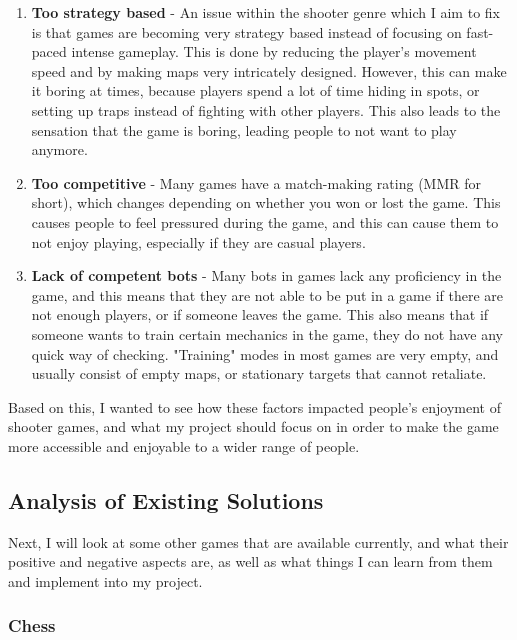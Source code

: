\begin{enumerate}[label=\textbf{\arabic*.}]
    \item \textbf{Too strategy based} - An issue within the shooter genre which I aim to fix is that games are becoming very strategy based instead of focusing on fast-paced intense gameplay. This is done by reducing the player's movement speed and by making maps very intricately designed. However, this can make it boring at times, because players spend a lot of time hiding in spots, or setting up traps instead of fighting with other players. This also leads to the sensation that the game is boring, leading people to not want to play anymore.
    \item \textbf{Too competitive} - Many games have a match-making rating (MMR for short), which changes depending on whether you won or lost the game. This causes people to feel pressured during the game, and this can cause them to not enjoy playing, especially if they are casual players.
    \item \textbf{Lack of competent bots} - Many bots in games lack any proficiency in the game, and this means that they are not able to be put in a game if there are not enough players, or if someone leaves the game. This also means that if someone wants to train certain mechanics in the game, they do not have any quick way of checking. "Training" modes in most games are very empty, and usually consist of empty maps, or stationary targets that cannot retaliate.
\end{enumerate}

Based on this, I wanted to see how these factors impacted people's enjoyment of shooter games, and what my project should focus on in order to make the game more accessible and enjoyable to a wider range of people.

\subsection{Analysis of Existing Solutions}

Next, I will look at some other games that are available currently, and what their positive and negative aspects are, as well as what things I can learn from them and implement into my project.


\vs

\subsubsection{Chess}

